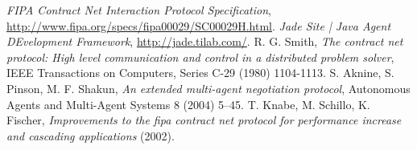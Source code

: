 \documentclass[a4paper, 10pt, conference]{ieeeconf} %
\begin{document}
\begin{thebibliography}{5}
\emph{FIPA Contract Net Interaction Protocol Specification}, \url{http://www.fipa.org/specs/fipa00029/SC00029H.html}.
\emph{Jade Site | Java Agent DEvelopment Framework}, \url{http://jade.tilab.com/}.
R. G. Smith, \emph{The contract net protocol: High level communication and control in a distributed problem solver}, IEEE Transactions on Computers, Series C-29 (1980) 1104-1113.
S. Aknine, S. Pinson, M. F. Shakun, \emph{An extended multi-agent negotiation protocol}, Autonomous Agents and Multi-Agent Systems 8 (2004) 5–45.
T. Knabe, M. Schillo, K. Fischer, \emph{Improvements to the fipa contract net protocol for performance increase and cascading applications} (2002).
\end{thebibliography}
\end{document}
